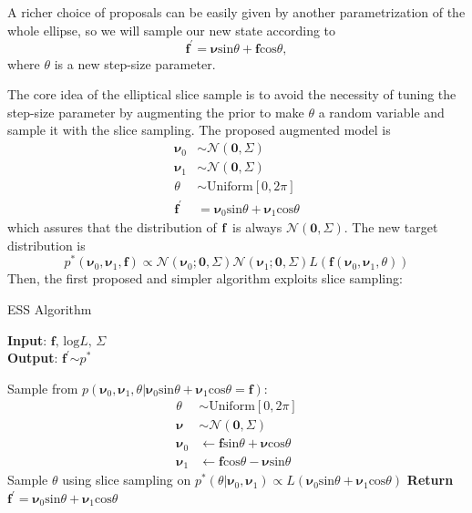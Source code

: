 \documentclass{article}
\begin{document}
A richer choice of proposals can be easily given by another parametrization of the whole ellipse, so we will sample our new state according to $$\mathbf{f^{'}}=\pmb{\nu}\text{sin}\theta+\mathbf{f}\text{cos}\theta,$$ where $\theta$ is a new step-size parameter.

The core idea of the elliptical slice sample is to avoid the necessity of tuning the step-size parameter by augmenting the prior to make $\theta$ a random variable and sample it with the slice sampling. The proposed augmented model is
\begin{align*}
\pmb{\nu}_0&\sim\mathcal{N}(\mathbf{0},\Sigma)\\
\pmb{\nu}_1&\sim\mathcal{N}(\mathbf{0},\Sigma)\\
\theta&\sim \text{Uniform}[0,2\pi]\\
\mathbf{f^{'}}&=\pmb{\nu}_0\text{sin}\theta+\pmb{\nu}_1\text{cos}\theta
\end{align*}
which assures that the distribution of $\bf{f}$ is always $\mathcal{N}(\mathbf{0},\Sigma)$. The new target distribution is $$p^*(\pmb{\nu}_0,\pmb{\nu}_1,\mathbf{f})\propto\mathcal{N}(\pmb{\nu}_0;\mathbf{0},\Sigma)\mathcal{N}(\pmb{\nu}_1;\mathbf{0},\Sigma)L(\mathbf{f}(\pmb{\nu}_0,\pmb{\nu}_1,\theta))$$
Then, the first proposed and simpler algorithm exploits slice sampling:\\

\begin{algorithm}
\caption{ESS Algorithm}\label{ess}
\hspace*{\algorithmicindent} \textbf{Input}: $\mathbf{f},\,\text{log}L,\,\Sigma$ \\
\hspace*{\algorithmicindent} \textbf{Output}: $\mathbf{f^{'}}$$\sim p^*$
\begin{algorithmic}[1]
  \State Sample from $p(\pmb{\nu}_0,\pmb{\nu}_1,\theta|\pmb{\nu}_0\text{sin}\theta+\pmb{\nu}_1\text{cos}\theta=\mathbf{f})$:
\begin{align*}
\theta &\sim\text{Uniform}[0,2\pi]\\
\pmb{\nu}&\sim\mathcal{N}(\mathbf{0},\Sigma)\\
\pmb{\nu}_0 &\leftarrow\mathbf{f}\text{sin}\theta+\pmb{\nu}\text{cos}\theta\\
\pmb{\nu}_1 &\leftarrow\mathbf{f}\text{cos}\theta-\pmb{\nu}\text{sin}\theta
\end{align*}
  \State Sample $\theta$ using slice sampling on $p^*(\theta|\pmb{\nu}_0,\pmb{\nu}_1)\propto L(\pmb{\nu}_0\text{sin}\theta+\pmb{\nu}_1\text{cos}\theta)$
  \State\textbf{Return} $\mathbf{f^{'}}=\pmb{\nu}_0\text{sin}\theta+\pmb{\nu}_1\text{cos}\theta$
\end{algorithmic}
\end{algorithm}
\end{document}
